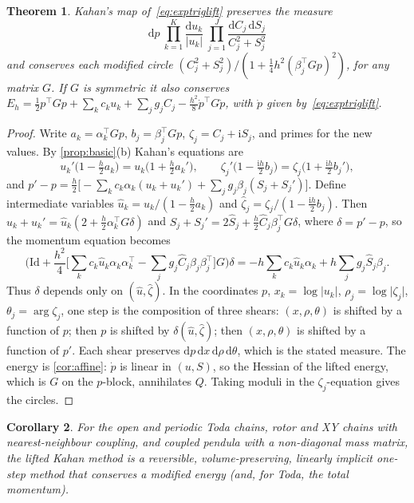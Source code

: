 \documentclass[11pt,a4paper]{article}
\newtheorem{theorem}{Theorem}[section]
\newtheorem{corollary}[theorem]{Corollary}
\theoremstyle{definition}
\theoremstyle{remark}
\newcommand{\Id}{\mathrm{Id}}
\newcommand{\dd}{\mathrm{d}}
\newcommand{\tr}{^{\!\top}}
\begin{document}
\begin{theorem}\label{thm:liouville}
Kahan's map of~\eqref{eq:exptriglift} preserves the measure
\[
\dd p\ \prod_{k=1}^K\frac{\dd u_k}{\lvert u_k\rvert}\ \prod_{j=1}^J\frac{\dd C_j\,\dd S_j}{C_j^2+S_j^2}
\]
and conserves each modified circle $(C_j^2+S_j^2)/(1+\frac14h^2(\beta_j\tr Gp)^2)$, for any matrix $G$. If $G$ is
symmetric it also conserves $E_h=\frac12p\tr Gp+\sum_kc_ku_k+\sum_jg_jC_j-\frac{h^2}{8}\dot p\tr G\dot p$, with
$\dot p$ given by~\eqref{eq:exptriglift}.
\end{theorem}

\begin{proof}
Write $a_k=\alpha_k\tr Gp$, $b_j=\beta_j\tr Gp$, $\zeta_j=C_j+\mathrm iS_j$, and primes for the new values. By
\cref{prop:basic}(b) Kahan's equations are
\[
u_k'\big(1-\tfrac h2a_k\big)=u_k\big(1+\tfrac h2a_k'\big),\qquad
\zeta_j'\big(1-\tfrac{\mathrm ih}2b_j\big)=\zeta_j\big(1+\tfrac{\mathrm ih}2b_j'\big),
\]
and $p'-p=\frac h2\big[-\sum_kc_k\alpha_k(u_k+u_k')+\sum_jg_j\beta_j(S_j+S_j')\big]$. Define intermediate
variables $\hat u_k=u_k/(1-\frac h2a_k)$ and $\hat\zeta_j=\zeta_j/(1-\frac{\mathrm ih}2b_j)$. Then
$u_k+u_k'=\hat u_k(2+\frac h2\alpha_k\tr G\delta)$ and
$S_j+S_j'=2\hat S_j+\frac h2\hat C_j\beta_j\tr G\delta$, where $\delta=p'-p$, so the momentum equation becomes
\[
\Big(\Id+\frac{h^2}{4}\Big[\sum_kc_k\hat u_k\alpha_k\alpha_k\tr-\sum_jg_j\hat C_j\beta_j\beta_j\tr\Big]G\Big)\delta
=-h\sum_kc_k\hat u_k\alpha_k+h\sum_jg_j\hat S_j\beta_j .
\]
Thus $\delta$ depends only on $(\hat u,\hat\zeta)$. In the coordinates $p$, $x_k=\log\lvert u_k\rvert$,
$\rho_j=\log\lvert\zeta_j\rvert$, $\theta_j=\arg\zeta_j$, one step is the composition of three shears:
$(x,\rho,\theta)$ is shifted by a function of $p$; then $p$ is shifted by $\delta(\hat u,\hat\zeta)$; then
$(x,\rho,\theta)$ is shifted by a function of $p'$. Each shear preserves $\dd p\,\dd x\,\dd\rho\,\dd\theta$,
which is the stated measure. The energy is \cref{cor:affine}: $\dot p$ is linear in $(u,S)$, so the Hessian of
the lifted energy, which is $G$ on the $p$-block, annihilates $Q$. Taking moduli in the $\zeta_j$-equation gives
the circles.
\end{proof}

\begin{corollary}\label{cor:toda}
For the open and periodic Toda chains, rotor and XY chains with nearest-neighbour coupling, and coupled
pendula with a non-diagonal mass matrix, the lifted Kahan method is a reversible, volume-preserving,
linearly implicit one-step method that conserves a modified energy (and, for Toda, the total momentum).
\end{corollary}
\end{document}
